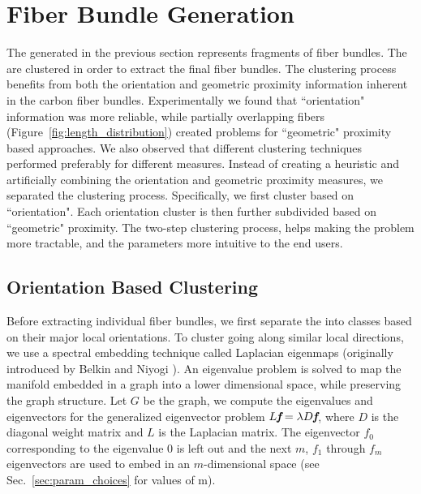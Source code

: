 \section{Fiber Bundle Generation}
\label{subsec:fiber-bundles}
The \mt generated in the previous section represents fragments of fiber bundles. The \mt are clustered in order to extract the final fiber bundles. The clustering process benefits from both the orientation and geometric proximity information inherent in the carbon fiber bundles. Experimentally we found that ``orientation" information was more reliable, while partially overlapping fibers (Figure~\ref{fig:length_distribution}) created problems for ``geometric" proximity based approaches. We also observed that different clustering techniques performed preferably for different measures. 
Instead of creating a heuristic and artificially combining the orientation and geometric proximity measures, we separated the clustering process. 
Specifically, we first cluster based on ``orientation". Each orientation cluster is then further subdivided based on ``geometric" proximity.
The two-step clustering process, helps making the problem more tractable, and the parameters more intuitive to the end users. 
\subsection{Orientation Based Clustering}
\label {subsec:orientation_clustering}
Before extracting individual fiber bundles, we first separate the \mt into classes based on their major local orientations. To cluster \mt going along similar local directions, we use a spectral embedding technique called Laplacian eigenmaps (originally introduced by Belkin and Niyogi \cite{Belkin01}). An eigenvalue problem is solved to map the manifold embedded in a graph into a lower dimensional space, while preserving the graph structure. 
Let $G$ be the graph, we compute the eigenvalues and eigenvectors for the generalized eigenvector problem $L\textit{\textbf{f}}=\lambda D\textit{\textbf{f}}$,
where $D$ is the diagonal weight matrix and $L$ is the Laplacian matrix. The eigenvector \textbf{${f}_{0}$} corresponding to the eigenvalue 0 is left out and the next $m$, {\textbf{${f}_{1}$} through \textbf{${f}_{m}$}} eigenvectors are used to embed in an $m$-dimensional space (see Sec.~\ref{sec:param_choices} for values of m). 

